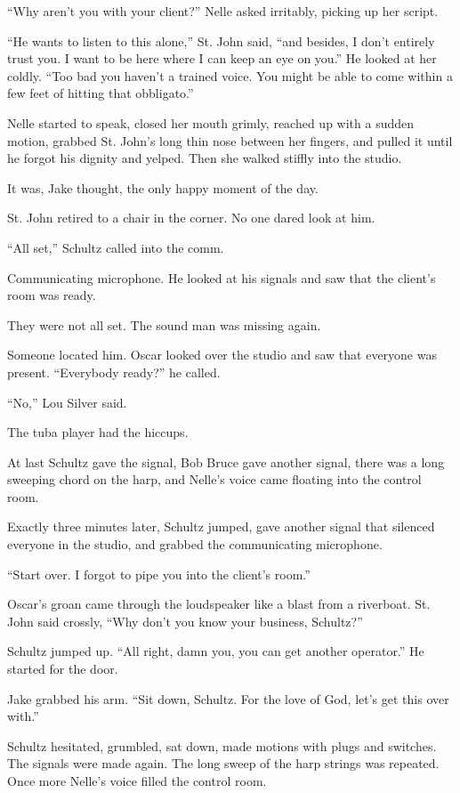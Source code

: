 \documentclass{novel}
\begin{document}
“Why aren’t you with your client?” Nelle asked irritably, picking up her script.

“He wants to listen to this alone,” St. John said, “and besides, I don’t entirely trust you. I want to be here where I can keep an eye on you.” He looked at her coldly. “Too bad you haven’t a trained voice. You might be able to come within a few feet of hitting that obbligato.”

Nelle started to speak, closed her mouth grimly, reached up with a sudden motion, grabbed St. John’s long thin nose between her fingers, and pulled it until he forgot his dignity and yelped. Then she walked stiffly into the studio.

It was, Jake thought, the only happy moment of the day.

St. John retired to a chair in the corner. No one dared look at him.

“All set,” Schultz called into the comm.

Communicating microphone. He looked at his signals and saw that the client’s room was ready.

They were not all set. The sound man was missing again.

Someone located him. Oscar looked over the studio and saw that everyone was present. “Everybody ready?” he called.

“No,” Lou Silver said.

The tuba player had the hiccups.

At last Schultz gave the signal, Bob Bruce gave another signal, there was a long sweeping chord on the harp, and Nelle’s voice came floating into the control room.

Exactly three minutes later, Schultz jumped, gave another signal that silenced everyone in the studio, and grabbed the communicating microphone.

“Start over. I forgot to pipe you into the client’s room.”

Oscar’s groan came through the loudspeaker like a blast from a riverboat. St. John said crossly, “Why don’t you know your business, Schultz?”

Schultz jumped up. “All right, damn you, you can get another operator.” He started for the door.

Jake grabbed his arm. “Sit down, Schultz. For the love of God, let’s get this over with.”

Schultz hesitated, grumbled, sat down, made motions with plugs and switches. The signals were made again. The long sweep of the harp strings was repeated. Once more Nelle’s voice filled the control room.
\end{document}
